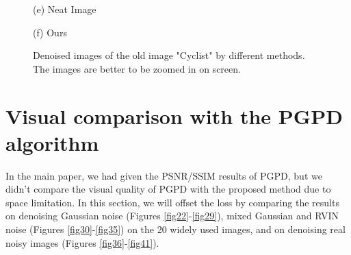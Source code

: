 \documentclass[runningheads]{llncs}
\begin{document}
\begin{figure}
{\begin{minipage}[t]{0.33\textwidth}
{\footnotesize (e) Neat Image}
\end{minipage}
\begin{minipage}[t]{0.33\textwidth}
\centering
{}
{\footnotesize (f) Ours }
\end{minipage}
}
\caption{Denoised images of the old image "Cyclist" by different methods. The images are better to be zoomed in on screen.}
\label{fig21}
\end{figure}

\clearpage
\section{Visual comparison with the PGPD algorithm}
In the main paper, we had given the PSNR/SSIM results of PGPD, but we didn't compare the visual quality of PGPD with the proposed method due to space limitation. In this section, we will offset the loss by comparing the results on denoising Gaussian noise (Figures \ref{fig22}-\ref{fig29}), mixed Gaussian and RVIN noise (Figures \ref{fig30}-\ref{fig35}) on the 20 widely used images, and on denoising real noisy images (Figures \ref{fig36}-\ref{fig41}).
 
\end{document}
